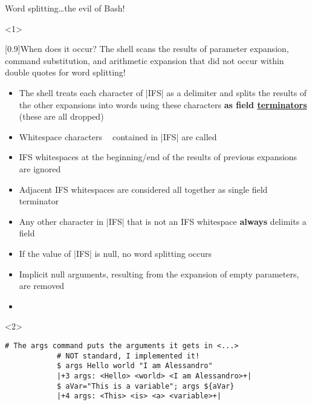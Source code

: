 \begin{frame}[fragile]{Word splitting}{\ldots{}the evil of Bash!}
    \vspace{-4mm}
    \begin{onlyenv}<1>
        \begin{varblock}{}[0.9\textwidth]{When does it occur?}
            The shell scans the results of parameter expansion, command substitution, and arithmetic expansion that did not occur within double quotes for word splitting!
        \end{varblock}
        \begin{itemize}
            \item The shell treats each character of \bash|IFS| as a delimiter and splits the results of the other expansions into words using these characters \textbf{as field \alert{\underline{terminators}}} (these are all dropped)
            \item Whitespace characters $\;$$\;$ contained in \bash|IFS| are called 
            \item \alert{IFS whitespaces at the beginning/end} of the results of previous expansions \alert{are ignored}
            \item \alert{Adjacent IFS whitespaces} are considered all together as \alert{single field terminator}
            \item \alert{Any other character} in \bash|IFS| that is not an IFS whitespace \alert{\textbf{always} delimits a field}
            \item If the value of \bash|IFS| is null, no word splitting occurs
            \item Implicit null arguments, resulting from the expansion of empty parameters, are removed
            \item {}
        \end{itemize}
    \end{onlyenv}
    \begin{onlyenv}<2>
        \begin{lstlisting}[style=MyBash, style=oddnumbers]
            # The args command puts the arguments it gets in <...>
            # NOT standard, I implemented it!
            $ args Hello world "I am Alessandro"
            |+3 args: <Hello> <world> <I am Alessandro>+|
            $ aVar="This is a variable"; args ${aVar}
            |+4 args: <This> <is> <a> <variable>+|

\end{lstlisting}
\end{onlyenv}
\end{frame}

